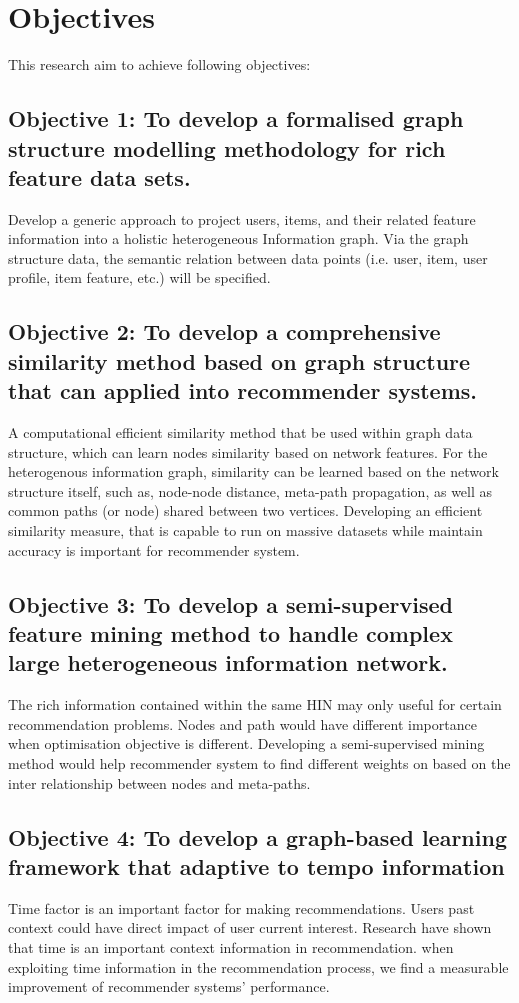 \documentclass[12pt,a4 paper,title page]{article}
\begin{document}
\section{Objectives}
This research aim to achieve following objectives: 

\subsection{Objective 1: To develop a formalised graph structure modelling methodology for rich feature data sets.  }

Develop a generic approach to project users, items, and their related feature information into a holistic heterogeneous Information graph. Via the graph structure data, the semantic relation between data points (i.e. user, item, user profile, item feature, etc.) will be specified.

\subsection{Objective 2: To develop a comprehensive similarity method based on graph structure that can applied into recommender systems. } 

A computational efficient similarity method that be used within graph data structure, which can learn nodes similarity based on network features. For the heterogenous information graph, similarity can be learned based on the network structure itself, such as, node-node distance, meta-path propagation, as well as common paths (or node) shared between two vertices. Developing an efficient similarity measure, that is capable to run on massive datasets while maintain accuracy is important for recommender system. 

\subsection{Objective 3: To develop a semi-supervised feature mining method to handle complex large heterogeneous information network.}

The rich information contained within the same HIN may only useful for certain recommendation problems. Nodes and path would have different importance when optimisation objective is different. Developing a semi-supervised mining method would help recommender system to find different weights on based on the inter relationship between nodes and meta-paths. 

\subsection{Objective 4: To develop a graph-based learning framework that adaptive to tempo information } 
Time factor is an important factor for making recommendations. Users past context could have direct impact of user current interest. Research have shown that time is an important context information in recommendation. when exploiting time information in the recommendation process, we find a measurable improvement of recommender systems’ performance. 
\end{document}
